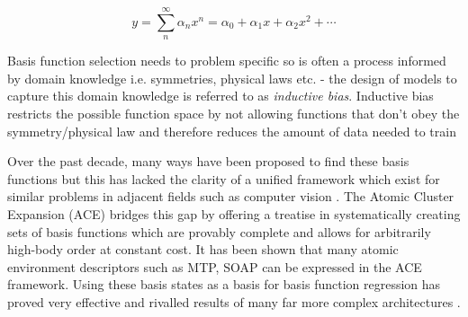 \begin{equation} \label{eq:basis-func}
    y = \sum_n^\infty \alpha_n x^n = \alpha_0 + \alpha_1 x + \alpha_2 x^2 + \cdots 
\end{equation}

Basis function selection needs to problem specific so is often a process informed by domain knowledge i.e. symmetries, physical laws etc. - the design of models to capture this domain knowledge is referred to as \textit{inductive bias}. Inductive bias restricts the possible function space by not allowing functions that don't obey the symmetry/physical law and therefore reduces the amount of data needed to train 

Over the past decade, many ways have been proposed to find these basis functions \cite{behler2011atom, shapeev2016moment, caro2019optimizing} but this has lacked the clarity of a unified framework which exist for similar problems in adjacent fields such as computer vision \cite{uhrin2021through}. The Atomic Cluster Expansion (ACE) \cite{drautz2019atomic, dusson2022atomic} bridges this gap by offering a treatise in systematically creating sets of basis functions which are provably complete and allows for arbitrarily high-body order at constant cost. It has been shown that many atomic environment descriptors such as MTP, SOAP \cite{shapeev2016moment, caro2019optimizing} can be expressed in the ACE framework. Using these basis states as a basis for basis function regression has proved very effective and rivalled results of many far more complex architectures \cite{kovacs2021linear}.





